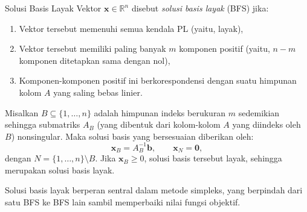 \begin{definition}{Solusi Basis Layak} Vektor \( \mathbf{x} \in \mathbb{R}^n \) disebut \emph{solusi basis layak} (BFS) jika:
\begin{enumerate}
    \item Vektor tersebut memenuhi semua kendala PL (yaitu, layak),
    \item Vektor tersebut memiliki paling banyak \( m \) komponen positif (yaitu, \( n - m \) komponen ditetapkan sama dengan nol),
    \item Komponen-komponen positif ini berkorespondensi dengan suatu himpunan kolom \( A \) yang saling bebas linier.
\end{enumerate}

\smallskip

Misalkan \( B \subseteq \{1, \dots, n\} \) adalah himpunan indeks berukuran \( m \) sedemikian sehingga submatriks \( A_B \) (yang dibentuk dari kolom-kolom \( A \) yang diindeks oleh \( B \)) nonsingular. Maka solusi basis yang bersesuaian diberikan oleh:
\[
\mathbf{x}_B = A_B^{-1} \mathbf{b}, \qquad \mathbf{x}_N = \mathbf{0},
\]
dengan \( N = \{1, \dots, n\} \setminus B \). Jika \( \mathbf{x}_B \geq 0 \), solusi basis tersebut layak, sehingga merupakan solusi basis layak.
\end{definition}
\smallskip

\noindent Solusi basis layak berperan sentral dalam metode simpleks, yang berpindah dari satu BFS ke BFS lain sambil memperbaiki nilai fungsi objektif.

